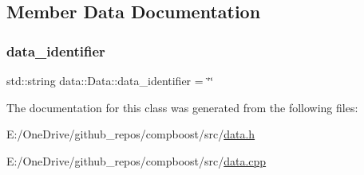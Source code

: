 \subsection{Member Data Documentation}
\mbox{\label{classdata_1_1_data_ad61ef163c5ec01dd46be054a688d2be8}} 
\subsubsection{\texorpdfstring{data\+\_\+identifier}{data\_identifier}}
{\footnotesize\ttfamily std\+::string data\+::\+Data\+::data\+\_\+identifier = \char`\"{}\char`\"{}\hspace{0.3cm}{\ttfamily [protected]}}



The documentation for this class was generated from the following files\+:\begin{DoxyCompactItemize}
\item 
E\+:/\+One\+Drive/github\+\_\+repos/compboost/src/\mbox{\hyperlink{data_8h}{data.\+h}}\item 
E\+:/\+One\+Drive/github\+\_\+repos/compboost/src/\mbox{\hyperlink{data_8cpp}{data.\+cpp}}\end{DoxyCompactItemize}

